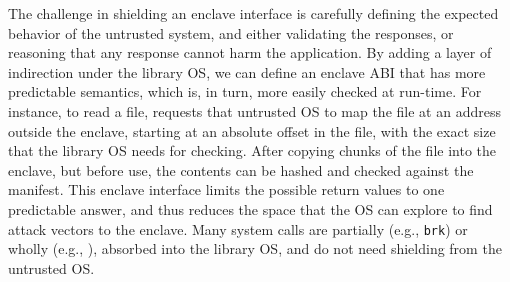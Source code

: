 The challenge in shielding an enclave interface is carefully
defining the expected behavior of the untrusted system,
and either validating the responses, or reasoning that any response 
cannot harm the application.
By adding a layer of indirection under the library OS, we can define
an enclave ABI that has
more predictable semantics, which is, in turn, more easily checked at run-time.
For instance, to read a file, \graphenesgx{} requests that untrusted OS to map the file at an address outside the enclave, starting at an absolute offset in the file, with the exact size that the library OS needs for checking.
After copying chunks of the file into the enclave, but before use, the contents can be hashed and checked against the manifest.
This enclave interface limits the possible return values to one predictable answer, and thus reduces the space that the OS can explore to find attack vectors to the enclave.
Many system calls are partially (e.g., {\tt brk}) or wholly (e.g., ), absorbed into the library OS, and do not need shielding from the untrusted OS.

